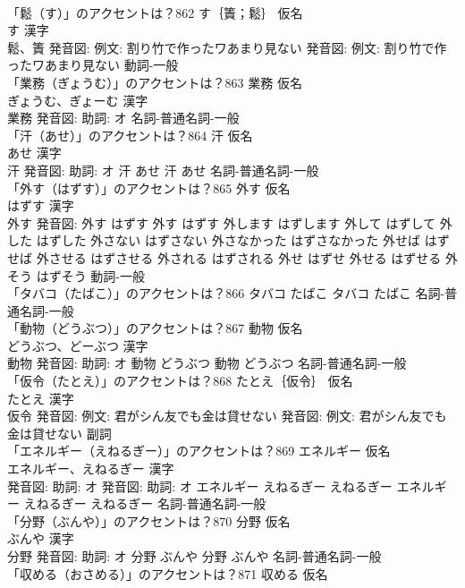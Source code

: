 \documentclass[8pt]{extreport}
\begin{document}
\begin{CJK}{UTF8}{min}
\\	「鬆（す）」のアクセントは？862	す｛簀；鬆｝ 仮名　
\\	す 漢字　
\\	鬆、簀 発音図: 例文: 割り竹で作ったワあまり見ない 発音図: 例文: 割り竹で作ったワあまり見ない							動詞-一般 
\\	「業務（ぎょうむ）」のアクセントは？863	業務 仮名　
\\	ぎょうむ、ぎょーむ 漢字　
\\	業務 発音図: 助詞: オ							名詞-普通名詞-一般 
\\	「汗（あせ）」のアクセントは？864	汗 仮名　
\\	あせ 漢字　
\\	汗 発音図: 助詞: オ	汗 あせ		汗 あせ				名詞-普通名詞-一般 
\\	「外す（はずす）」のアクセントは？865	外す 仮名　
\\	はずす 漢字　
\\	外す 発音図:	外す はずす		外す はずす 外します はずします 外して はずして 外した はずした 外さない はずさない 外さなかった はずさなかった 外せば はずせば 外させる はずさせる 外される はずされる 外せ はずせ 外せる はずせる 外そう はずそう				動詞-一般 
\\	「タバコ（たばこ）」のアクセントは？866		タバコ たばこ		タバコ たばこ				名詞-普通名詞-一般 
\\	「動物（どうぶつ）」のアクセントは？867	動物 仮名　
\\	どうぶつ、どーぶつ 漢字　
\\	動物 発音図: 助詞: オ	動物 どうぶつ		動物 どうぶつ				名詞-普通名詞-一般 
\\	「仮令（たとえ）」のアクセントは？868	たとえ｛仮令｝ 仮名　
\\	たとえ 漢字　
\\	仮令 発音図: 例文: 君がシん友でも金は貸せない 発音図: 例文: 君がシん友でも金は貸せない							副詞 
\\	「エネルギー（えねるぎー）」のアクセントは？869	エネルギー 仮名　
\\	エネルギー、えねるぎー 漢字　
\\	発音図: 助詞: オ 発音図: 助詞: オ	エネルギー えねるぎー えねるぎー		エネルギー えねるぎー えねるぎー				名詞-普通名詞-一般 
\\	「分野（ぶんや）」のアクセントは？870	分野 仮名　
\\	ぶんや 漢字　
\\	分野 発音図: 助詞: オ	分野 ぶんや		分野 ぶんや				名詞-普通名詞-一般 
\\	「収める（おさめる）」のアクセントは？871	収める 仮名　

\end{CJK}
\end{document}

